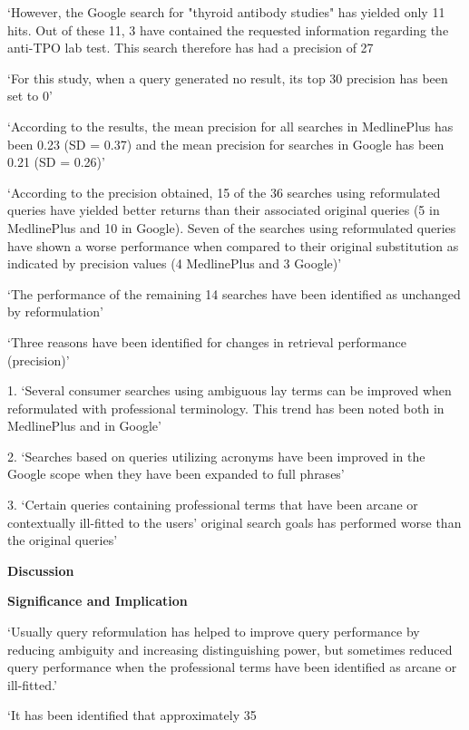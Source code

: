 \documentclass[]{article}
\begin{document}
{{{‘However, the Google search for "thyroid antibody studies" has yielded only 11 hits. Out of these 11, 3 have contained the requested information regarding the anti-TPO lab test. This search therefore has had a precision of 27%

‘For this study, when a query generated no result, its top 30 precision has been set to 0’

‘According to the results, the mean precision for all searches in MedlinePlus has been 0.23 (SD = 0.37) and the mean precision for searches in Google has been 0.21 (SD = 0.26)’

‘According to the precision obtained, 15 of the 36 searches using reformulated queries have yielded better returns than their associated original queries (5 in MedlinePlus and 10 in Google). Seven of the searches using reformulated queries have shown a worse performance when compared to their original substitution as indicated by precision values (4 MedlinePlus and 3 Google)’

‘The performance of the remaining 14 searches have been identified as unchanged by reformulation’

‘Three reasons have been identified for changes in retrieval performance (precision)’

1.	‘Several consumer searches using ambiguous lay terms can be improved when reformulated with professional terminology. This trend has been noted both in MedlinePlus and in Google’

2.	‘Searches based on queries utilizing acronyms have been improved in the Google scope when they have been expanded to full phrases’

3.	‘Certain queries containing professional terms that have been arcane or contextually ill-fitted to the users' original search goals has performed worse than the original queries’

\textbf{Discussion}

\textbf{Significance and Implication}

‘Usually query reformulation has helped to improve query performance by reducing ambiguity and increasing distinguishing power, but sometimes reduced query performance when the professional terms have been identified as arcane or ill-fitted.’

‘It has been identified that approximately 35%

}}}
\end{document}
